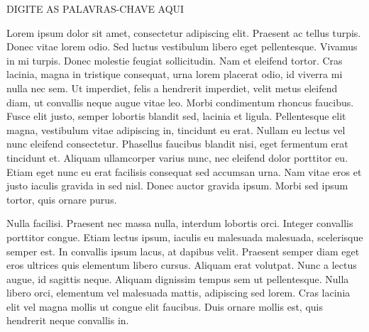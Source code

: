 \documentclass[bsc, classic, a4paper]{ufbathesis}
\begin{document}
\abstract
\begin{keywords}
DIGITE AS PALAVRAS-CHAVE AQUI
\end{keywords}

\tableofcontents

\listoffigures

\listoftables

\mainmatter

% 
% 
% 
%


Lorem ipsum dolor sit amet, consectetur adipiscing elit. Praesent ac tellus turpis. Donec vitae lorem odio. Sed luctus vestibulum libero eget pellentesque. Vivamus in mi turpis. Donec molestie feugiat sollicitudin. Nam et eleifend tortor. Cras lacinia, magna in tristique consequat, urna lorem placerat odio, id viverra mi nulla nec sem. Ut imperdiet, felis a hendrerit imperdiet, velit metus eleifend diam, ut convallis neque augue vitae leo. Morbi condimentum rhoncus faucibus. Fusce elit justo, semper lobortis blandit sed, lacinia et ligula. Pellentesque elit magna, vestibulum vitae adipiscing in, tincidunt eu erat. Nullam eu lectus vel nunc eleifend consectetur. Phasellus faucibus blandit nisi, eget fermentum erat tincidunt et. Aliquam ullamcorper varius nunc, nec eleifend dolor porttitor eu. Etiam eget nunc eu erat facilisis consequat sed accumsan urna. Nam vitae eros et justo iaculis gravida in sed nisl. Donec auctor gravida ipsum. Morbi sed ipsum tortor, quis ornare purus.

Nulla facilisi. Praesent nec massa nulla, interdum lobortis orci. Integer convallis porttitor congue. Etiam lectus ipsum, iaculis eu malesuada malesuada, scelerisque semper est. In convallis ipsum lacus, at dapibus velit. Praesent semper diam eget eros ultrices quis elementum libero cursus. Aliquam erat volutpat. Nunc a lectus augue, id sagittis neque. Aliquam dignissim tempus sem ut pellentesque. Nulla libero orci, elementum vel malesuada mattis, adipiscing sed lorem. Cras lacinia elit vel magna mollis ut congue elit faucibus. Duis ornare mollis est, quis hendrerit neque convallis in.
\end{document}
